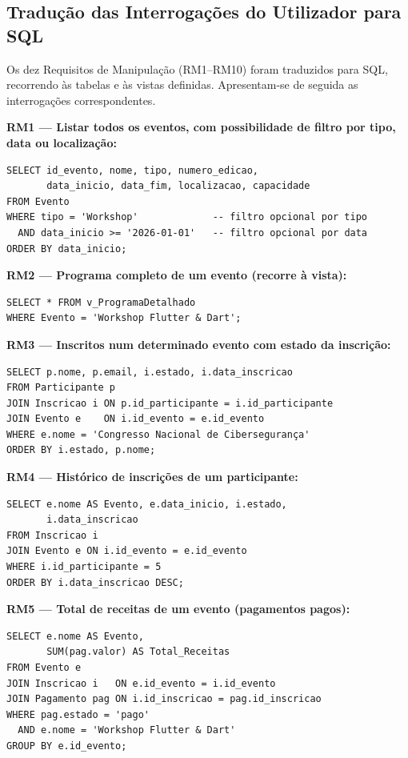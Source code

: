 \documentclass[runningheads]{llncs}
\begin{document}
                \subsection{Tradução das Interrogações do Utilizador para SQL}

                Os dez Requisitos de Manipulação (RM1--RM10) foram traduzidos para SQL, recorrendo às tabelas e às vistas definidas. Apresentam-se de seguida as interrogações correspondentes.

                \vspace{0.3cm}
                \textbf{RM1 — Listar todos os eventos, com possibilidade de filtro por tipo, data ou localização:}
                \begin{verbatim}
SELECT id_evento, nome, tipo, numero_edicao,
       data_inicio, data_fim, localizacao, capacidade
FROM Evento
WHERE tipo = 'Workshop'             -- filtro opcional por tipo
  AND data_inicio >= '2026-01-01'   -- filtro opcional por data
ORDER BY data_inicio;
                \end{verbatim}

                \textbf{RM2 — Programa completo de um evento (recorre à vista):}
                \begin{verbatim}
SELECT * FROM v_ProgramaDetalhado
WHERE Evento = 'Workshop Flutter & Dart';
                \end{verbatim}

                \textbf{RM3 — Inscritos num determinado evento com estado da inscrição:}
                \begin{verbatim}
SELECT p.nome, p.email, i.estado, i.data_inscricao
FROM Participante p
JOIN Inscricao i ON p.id_participante = i.id_participante
JOIN Evento e    ON i.id_evento = e.id_evento
WHERE e.nome = 'Congresso Nacional de Cibersegurança'
ORDER BY i.estado, p.nome;
                \end{verbatim}

                \textbf{RM4 — Histórico de inscrições de um participante:}
                \begin{verbatim}
SELECT e.nome AS Evento, e.data_inicio, i.estado,
       i.data_inscricao
FROM Inscricao i
JOIN Evento e ON i.id_evento = e.id_evento
WHERE i.id_participante = 5
ORDER BY i.data_inscricao DESC;
                \end{verbatim}

                \textbf{RM5 — Total de receitas de um evento (pagamentos pagos):}
                \begin{verbatim}
SELECT e.nome AS Evento,
       SUM(pag.valor) AS Total_Receitas
FROM Evento e
JOIN Inscricao i   ON e.id_evento = i.id_evento
JOIN Pagamento pag ON i.id_inscricao = pag.id_inscricao
WHERE pag.estado = 'pago'
  AND e.nome = 'Workshop Flutter & Dart'
GROUP BY e.id_evento;
                \end{verbatim}
\end{document}
